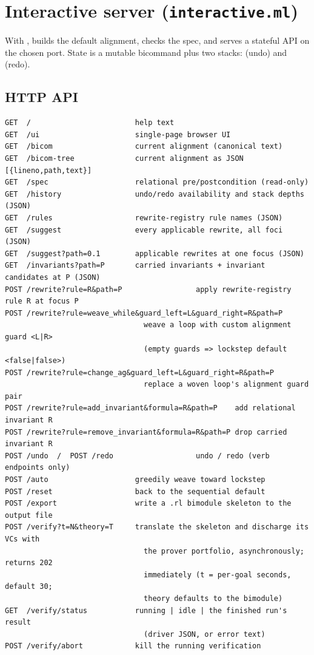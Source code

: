 \documentclass[11pt]{article}
\newcommand{\code}[1]{\texttt{\detokenize{#1}}}
\begin{document}
\section{Interactive server (\texttt{interactive.ml})}
\label{sec:interactive}

With \code{-i}, \code{Interactive.run} builds the default alignment, checks the
spec, and serves a stateful API on the chosen port. State is a mutable
\code{current} bicommand plus two stacks: \code{history} (undo) and \code{future}
(redo).

\subsection{HTTP API}

\begin{lstlisting}
GET  /                        help text
GET  /ui                      single-page browser UI
GET  /bicom                   current alignment (canonical text)
GET  /bicom-tree              current alignment as JSON [{lineno,path,text}]
GET  /spec                    relational pre/postcondition (read-only)
GET  /history                 undo/redo availability and stack depths (JSON)
GET  /rules                   rewrite-registry rule names (JSON)
GET  /suggest                 every applicable rewrite, all foci (JSON)
GET  /suggest?path=0.1        applicable rewrites at one focus (JSON)
GET  /invariants?path=P       carried invariants + invariant candidates at P (JSON)
POST /rewrite?rule=R&path=P                 apply rewrite-registry rule R at focus P
POST /rewrite?rule=weave_while&guard_left=L&guard_right=R&path=P
                                weave a loop with custom alignment guard <L|R>
                                (empty guards => lockstep default <false|false>)
POST /rewrite?rule=change_ag&guard_left=L&guard_right=R&path=P
                                replace a woven loop's alignment guard pair
POST /rewrite?rule=add_invariant&formula=R&path=P    add relational invariant R
POST /rewrite?rule=remove_invariant&formula=R&path=P drop carried invariant R
POST /undo  /  POST /redo                   undo / redo (verb endpoints only)
POST /auto                    greedily weave toward lockstep
POST /reset                   back to the sequential default
POST /export                  write a .rl bimodule skeleton to the output file
POST /verify?t=N&theory=T     translate the skeleton and discharge its VCs with
                                the prover portfolio, asynchronously; returns 202
                                immediately (t = per-goal seconds, default 30;
                                theory defaults to the bimodule)
GET  /verify/status           running | idle | the finished run's result
                                (driver JSON, or error text)
POST /verify/abort            kill the running verification
\end{lstlisting}
\end{document}
